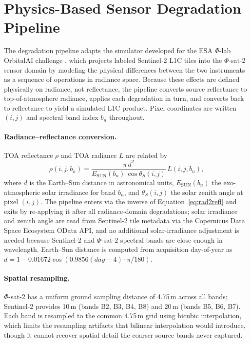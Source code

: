 \section{Physics-Based Sensor Degradation Pipeline}
\label{sec:degradation-pipeline}

The degradation pipeline adapts the simulator developed for the ESA $\Phi$-lab OrbitalAI challenge \cite{longepe2024orbitalai}, which projects labeled Sentinel-2 L1C tiles into the $\Phi$-sat-2 sensor domain by modeling the physical differences between the two instruments as a sequence of operations in radiance space.
Because these effects are defined physically on radiance, not reflectance, the pipeline converts source reflectance to top-of-atmosphere radiance, applies each degradation in turn, and converts back to reflectance to yield a simulated L1C product.
Pixel coordinates are written $(i,j)$ and spectral band index $b_n$ throughout.

\paragraph{Radiance--reflectance conversion.} TOA reflectance $\rho$ and TOA radiance $L$ are related by
\begin{equation}
    \rho(i,j,b_n) = \frac{\pi\, d^2}{E_{\text{SUN}}(b_n)\,\cos\theta_S(i,j)}\, L(i,j,b_n),
    \label{eq:rad2refl}
\end{equation}
where $d$ is the Earth--Sun distance in astronomical units, $E_{\text{SUN}}(b_n)$ the exo-atmospheric solar irradiance for band $b_n$, and $\theta_S(i,j)$ the solar zenith angle at pixel $(i,j)$.
The pipeline enters via the inverse of Equation~\eqref{eq:rad2refl} and exits by re-applying it after all radiance-domain degradations; solar irradiance and zenith angle are read from Sentinel-2 tile metadata via the Copernicus Data Space Ecosystem OData API, and no additional solar-irradiance adjustment is needed because Sentinel-2 and $\Phi$-sat-2 spectral bands are close enough in wavelength.
Earth--Sun distance is computed from acquisition day-of-year as $d = 1 - 0.01672\cos(0.9856(day - 4)\cdot \pi/180)$.

\paragraph{Spatial resampling.} $\Phi$-sat-2 has a uniform ground sampling distance of 4.75\,m across all bands; Sentinel-2 provides 10\,m (bands B2, B3, B4, B8) and 20\,m (bands B5, B6, B7).
Each band is resampled to the common 4.75\,m grid using bicubic interpolation, which limits the resampling artifacts that bilinear interpolation would introduce, though it cannot recover spatial detail the coarser source bands never captured.

